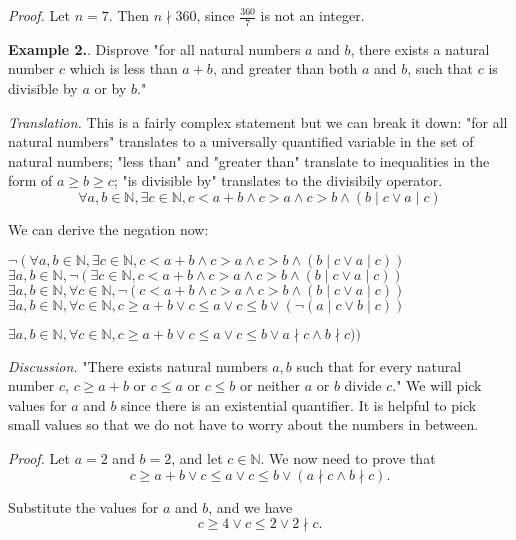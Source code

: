 \documentclass{article}
\newcounter{excount}
\newcommand\ex{\stepcounter{excount} \textbf{Example 2.\theexcount}. }
\begin{document}
\textit{Proof.} Let $n = 7$. Then $n \nmid 360$, since $\frac{360}{7}$ is not an integer.

\ex Disprove "for all natural numbers $a$ and $b$, there exists a natural 
number $c$ which is less than $a+b$, and greater than both $a$ and $b$, such 
that $c$ is divisible by $a$ or by $b$."

\textit{Translation.} This is a fairly complex statement but we can break it down: 
"for all natural numbers" translates to a universally quantified variable in 
the set of natural numbers; "less than" and "greater than" translate to inequalities 
in the form of $a \geq b \geq c$; "is divisible by" translates to the divisibily 
operator. 
$$\forall a, b \in \mathbb{N}, \exists c \in \mathbb{N}, c < a + b \land 
c > a \land c > b \land (b \mid c \lor a \mid c)$$

We can derive the negation now:
\begin{center}
$\neg(\forall a, b \in \mathbb{N}, \exists c \in \mathbb{N}, c < a + b \land 
c > a \land c > b \land (b \mid c \lor a \mid c))$ \\
$\exists a, b \in \mathbb{N}, \neg (\exists c \in \mathbb{N}, c < a + b \land 
c > a \land c > b \land (b \mid c \lor a \mid c))$ \\
$\exists a, b \in \mathbb{N}, \forall c \in \mathbb{N}, \neg (c < a + b \land
c > a \land c > b \land (b \mid c \lor a \mid c))$ \\
$\exists a, b \in \mathbb{N}, \forall c \in \mathbb{N}, c \geq a + b \lor 
c \leq a \lor c \leq b \lor (\neg (a \mid c \lor b \mid c))$

$\exists a, b \in \mathbb{N}, \forall c \in \mathbb{N}, c \geq a + b \lor 
c \leq a \lor c \leq b \lor a \nmid c \land b \nmid c))$ \\
\end{center}

\textit{Discussion.} "There exists natural numbers $a, b$ such that for every 
natural number $c$, $c \geq a + b$ or $c \leq a$ or $c \leq b$ or neither 
$a$ or $b$ divide $c$." We will pick values for $a$ and $b$ since there is 
an existential quantifier. It is helpful to pick small values so that we do not 
have to worry about the numbers in between. 

\textit{Proof.} Let $a = 2 $ and $b = 2$, and let $c \in \mathbb{N}$. We 
now need to prove that 
$$c \geq a + b \lor c \leq a \lor c \leq b \lor (a \nmid c \land b \nmid c).$$

Substitute the values for $a$ and $b$, and we have
$$c \geq 4 \lor c \leq 2 \lor 2 \nmid c.$$
\end{document}
